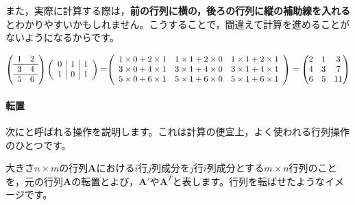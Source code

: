 \documentclass{ltjsbook}
\begin{document}
また，実際に計算する際は，\textbf{前の行列に横の，後ろの行列に縦の補助線を入れる}とわかりやすいかもしれません。こうすることで，間違えて計算を進めることがないようになるからです。

\begin{equation*}
    \left(
    \begin{array}{cc}
        1 & 2 \\\hline
        3 & 4 \\\hline
        5 & 6 \\
    \end{array}
    \right)
    \left(
    \begin{array}{c|c|c}
        0 & 1 & 1 \\
        1 & 0 & 1
    \end{array}
    \right)
    =
    $$
    $$
    \left(
    \begin{array}{ccc}
        1 \times 0 + 2 \times 1 & 1 \times 1 + 2 \times 0 & 1 \times 1+2\times 1 \\
        3 \times 0 + 4 \times 1 & 3 \times 1 + 4 \times 0 & 3 \times 1+4\times 1 \\
        5 \times 0 + 6 \times 1 & 5 \times 1 + 6 \times 0 & 5 \times 1+6\times 1 \\
    \end{array}
    \right)
    =
    \begin{pmatrix}
        2 & 1 & 3  \\
        4 & 3 & 7  \\
        6 & 5 & 11
    \end{pmatrix}
\end{equation*}


\paragraph{転置}
次にと呼ばれる操作を説明します。これは計算の便宜上，よく使われる行列操作のひとつです。

大きさ$n \times m$の行列$\bm{A}$における$i$行$j$列成分を$j$行$i$列成分とする$m \times n$行列のことを，元の行列$\bm{A}$の転置とよび，$\bm{A}'$や$\bm{A}^T$と表します。行列を転ばせたようなイメージです。
\end{document}
